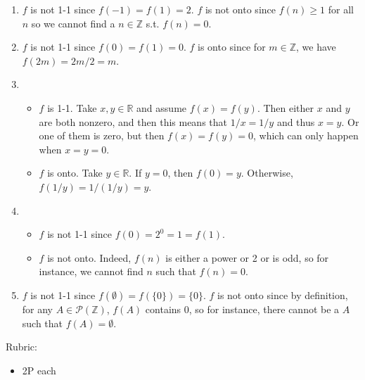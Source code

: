 \documentclass{article}
\newcommand{\Z}{\mathbb{Z}}
\newcommand{\R}{\mathbb{R}}
\theoremstyle{definition}
\begin{document}
\begin{solution}
\begin{enumerate}
	\item $f$ is not 1-1 since $f(-1) = f(1) = 2$. $f$ is not onto since $f(n) \geq 1$ for all $n$ so we cannot find a $n \in \Z$ s.t. $f(n) = 0$.
	
	\item $f$ is not 1-1 since $f(0) = f(1) = 0$. $f$ is onto since for $m \in \Z$, we have $f(2m) = 2m/2 = m$.
	
	\item
	\begin{itemize}
		\item $f$ is 1-1. Take $x, y \in \R$ and assume $f(x) = f(y)$. Then either $x$ and $y$ are both nonzero, and then this means that $1/x = 1/y$ and thus $x = y$. Or one of them is zero, but then $f(x) = f(y) = 0$, which can only happen when $x = y = 0$.
		\item $f$ is onto. Take $y \in \R$. If $y = 0$, then $f(0) = y$. Otherwise, $f(1/y) = 1/(1/y) = y$.
	\end{itemize}
	
	\item 
	
	\begin{itemize}
		\item $f$ is not 1-1 since $f(0) = 2^0 = 1 = f(1)$.
		
		\item $f$ is not onto. Indeed, $f(n)$ is either a power or 2 or is odd, so for instance, we cannot find $n$ such that $f(n) = 0$.
		
	\end{itemize}
	
	\item $f$ is not 1-1 since $f(\emptyset) = f(\{0 \}) = \{ 0 \}$. $f$ is not onto since by definition, for any $A \in \mathcal{P}(\Z)$, $f(A)$ contains 0, so for instance, there cannot be a $A$ such that $f(A) = \emptyset$.
	
\end{enumerate}

{\color{red} Rubric:
\begin{itemize}
\item 2P each
\end{itemize}}
\end{solution}
\end{document}
